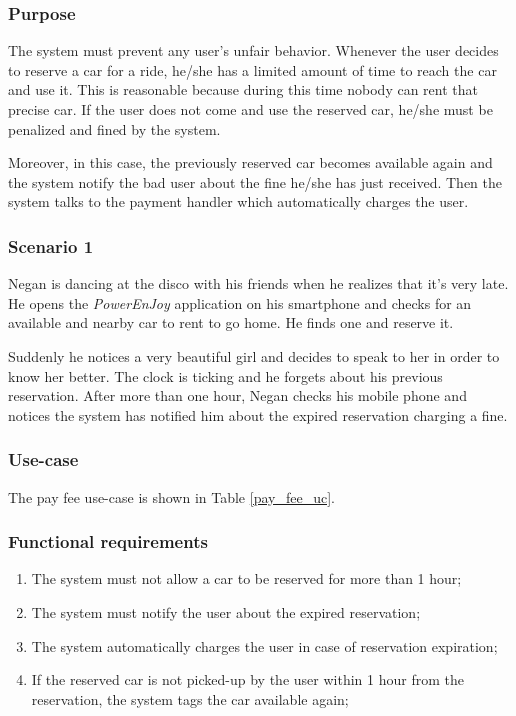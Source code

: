 \subsubsection{Purpose}
The system must prevent any user's unfair behavior. Whenever the user decides to reserve a car for a ride, he/she has a limited amount of time to reach the car and use it. This is reasonable because during this time nobody can rent that precise car. If the user does not come and use the reserved car, he/she must be penalized and fined by the system.

Moreover, in this case, the previously reserved car becomes available again and the system notify the bad user about the fine he/she has just received. Then the system talks to the payment handler which automatically charges the user.

\subsubsection{Scenario 1}
Negan is dancing at the disco with his friends when he realizes that it's very late. He opens the \emph{PowerEnJoy} application on his smartphone and checks for an available and nearby car to rent to go home. He finds one and reserve it.

Suddenly he notices a very beautiful girl and decides to speak to her in order to know her better. The clock is ticking and he forgets about his previous reservation. After more than one hour, Negan checks his mobile phone and notices the system has notified him about the expired reservation charging a fine.

\subsubsection{Use-case}
The pay fee use-case is shown in Table \ref{pay_fee_uc}.

\subsubsection{Functional requirements}
\begin{enumerate}
\item The system must not allow a car to be reserved for more than 1 hour;
\item The system must notify the user about the expired reservation;
\item The system automatically charges the user in case of reservation expiration;
\item If the reserved car is not picked-up by the user within 1 hour from the reservation, the system tags the car available again;
\end{enumerate}

